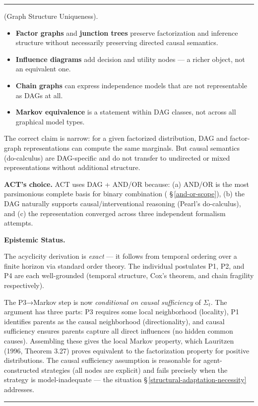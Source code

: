 \documentclass[11pt,oneside]{article}
\newcounter{claim}[section]
\renewcommand{\theclaim}{\thesection.\arabic{claim}}
\newenvironment{segment}[2]{%
  \refstepcounter{claim}%
  \bigskip\noindent\hrule\smallskip
  \noindent{\bfseries #1~\theclaim}\enskip(#2).\par\smallskip
  \noindent\ignorespaces
}{%
  \par\smallskip\noindent\hrule\bigskip
}
\newenvironment{derivation}[1][]{\begin{segment}{Derivation}{#1}}{\end{segment}}
\begin{document}
\begin{derivation}[Graph Structure Uniqueness]
\begin{itemize}
  \item \textbf{Factor graphs} and \textbf{junction trees} preserve factorization and inference structure without necessarily preserving directed causal semantics.
  \item \textbf{Influence diagrams} add decision and utility nodes — a richer object, not an equivalent one.
  \item \textbf{Chain graphs} can express independence models that are not representable as DAGs at all.
  \item \textbf{Markov equivalence} is a statement within DAG classes, not across all graphical model types.
\end{itemize}


The correct claim is narrow: for a given factorized distribution, DAG and factor-graph representations can compute the same marginals. But causal semantics (do-calculus) are DAG-specific and do not transfer to undirected or mixed representations without additional structure.

\textbf{ACT's choice.} ACT uses DAG + AND/OR because: (a) AND/OR is the most parsimonious complete basis for binary combination ( \S\,\ref{and-or-scope}), (b) the DAG naturally supports causal/interventional reasoning (Pearl's do-calculus), and (c) the representation converged across three independent formalism attempts.


\medskip\noindent\textbf{Epistemic Status.}


The acyclicity derivation is \textit{exact} — it follows from temporal ordering over a finite horizon via standard order theory. The individual postulates P1, P2, and P4 are each well-grounded (temporal structure, Cox's theorem, and chain fragility respectively).

The P3→Markov step is now \textit{conditional on causal sufficiency} of $\Sigma_t$. The argument has three parts: P3 requires some local neighborhood (locality), P1 identifies parents as the causal neighborhood (directionality), and causal sufficiency ensures parents capture all direct influences (no hidden common causes). Assembling these gives the local Markov property, which Lauritzen (1996, Theorem 3.27) proves equivalent to the factorization property for positive distributions. The causal sufficiency assumption is reasonable for agent-constructed strategies (all nodes are explicit) and fails precisely when the strategy is model-inadequate — the situation \S\,\ref{structural-adaptation-necessity} addresses.


\end{derivation}
\end{document}
